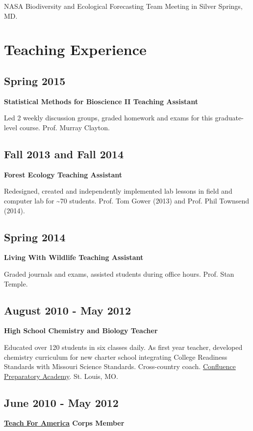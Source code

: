 \documentclass{article}
\begin{document}
NASA Biodiversity and Ecological Forecasting Team Meeting in Silver Springs, MD.
\section*{Teaching Experience}
\label{sec:orgd23ff33}
\subsection*{Spring 2015}
\label{sec:org6a0c576}
\textbf{Statistical Methods for Bioscience II Teaching Assistant}

Led 2 weekly discussion groups, graded homework and exams for this
graduate-level course. Prof. Murray Clayton.

\subsection*{Fall 2013 and Fall 2014}
\label{sec:org26488d3}
\textbf{Forest Ecology Teaching Assistant}

Redesigned, created and independently implemented lab lessons in field and computer lab for \textasciitilde{}70
students.  Prof. Tom Gower (2013) and Prof. Phil Townsend (2014).

\subsection*{Spring 2014}
\label{sec:orgde42ece}
\textbf{Living With Wildlife Teaching Assistant}

Graded journals and exams, assisted students during office hours.
Prof. Stan Temple.

\subsection*{August 2010 - May 2012}
\label{sec:orgbb585ac}
\textbf{High School Chemistry and Biology Teacher}

Educated over 120 students in six classes daily. As first year
teacher, developed chemistry curriculum for new charter school
integrating College Readiness Standards with Missouri Science
Standards. Cross-country coach. \href{https://www.google.com/search?q=Confluence+Preparatory+Academy+St.+Louis\&oq=Confluence+Prep+Academy+St.+Louis\&aqs=chrome..69i57.7294j0j8\&sourceid=chrome\&ie=UTF-8\#q=Confluence+Prep+Academy+High+School+St.+Louis}{Confluence Preparatory Academy}. St. Louis, MO.

\subsection*{June 2010 - May 2012}
\label{sec:orgd9f2c08}
\textbf{\href{https://www.teachforamerica.org/}{Teach For America} Corps Member}
\end{document}
